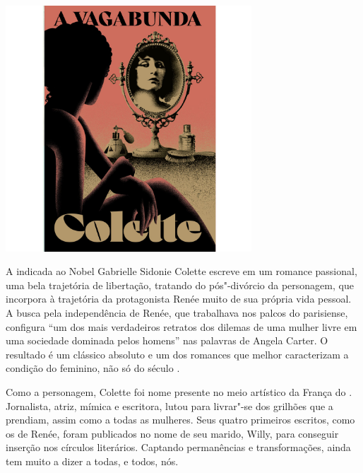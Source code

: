 \begin{center}
\hspace*{.5cm}\includegraphics[width=92mm]{./grid/vagabond.jpg}
\end{center}

\hspace*{-7cm}\hrulefill\hspace*{-7cm}

\medskip

\noindent{}A indicada ao Nobel Gabrielle Sidonie Colette escreve em {} um romance passional, uma bela trajetória de libertação, tratando do pós"-divórcio da personagem, que incorpora à trajetória da protagonista Renée muito de sua própria vida pessoal. A busca pela independência de Renée, que trabalhava nos palcos do {} parisiense, configura “um dos mais verdadeiros retratos dos dilemas de uma mulher livre em uma sociedade dominada pelos homens” nas palavras de Angela Carter. O resultado é um clássico absoluto e um dos romances que melhor caracterizam a condição do feminino, não só do século .

Como a personagem, Colette foi nome presente no meio artístico da França do . Jornalista, atriz, mímica e escritora, lutou para livrar"-se dos grilhões que a prendiam, assim como a todas as mulheres. Seus quatro primeiros escritos, como os de Renée, foram publicados no nome de seu marido, Willy, para conseguir inserção nos círculos literários. Captando permanências e transformações, {} ainda tem muito a dizer a todas, e todos, nós.

\vfill

\hspace*{-.4cm}\begin{minipage}[c]{.5\linewidth}
\small{
{}}
\end{minipage}

